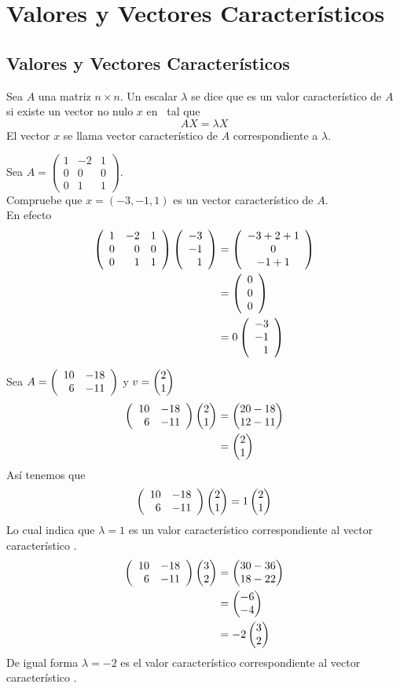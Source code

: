 \chapter{Valores y Vectores Característicos}
\section{Valores y Vectores Característicos}

\begin{dfn}
Sea $A$ una matriz $n\times n$. Un escalar $\lambda$ se dice que es un valor característico de $A$ si existe un vector no nulo $x$ en \rn \ tal que
$$A X = \lambda X$$
El vector $x$ se llama vector característico de $A$ correspondiente a $\lambda$.
\end{dfn}

\begin{ejemplo}
Sea $A = \left( \begin{array}{rrr}
1 & -2 & 1\\
0 & 0 & 0\\
0 & 1 & 1
\end{array} \right)$.\\
Compruebe que $x= (-3, -1, 1)$ es un vector característico de $A$.\\
\noindent En efecto 
\begin{align*}
\left( \begin{array}{rrr}
1 & -2 &1\\
0 & 0 & 0\\
0&1&1
\end{array} \right)
\left( \begin{array}{r} -3\\ -1\\ 1 \end{array} \right)  &=
\left( \begin{array}{c}
-3+2+1\\
0\\
-1+1
\end{array} \right)\\
&= \left( \begin{array}{r} 0\\ 0\\ 0 \end{array} \right) \\
&= 0 \left( \begin{array}{r} -3\\ -1\\ 1 \end{array} \right) 
\end{align*}
\end{ejemplo}


\begin{ejemplo}
Sea $A = \left( \begin{array}{rr} 10 & -18\\ 6 & -11 \end{array} \right) $ y $v= \begin{pmatrix} 2\\ 1\\ \end{pmatrix} $\\
\begin{align*}
 \left( \begin{array}{rr} 10 & -18\\ 6 & -11 \end{array} \right)  \begin{pmatrix} 2\\ 1\\ \end{pmatrix}  &= \begin{pmatrix} 20-18\\ 12-11\\ \end{pmatrix} \\
&= \begin{pmatrix} 2\\ 1\\ \end{pmatrix} 
\end{align*}
Así tenemos que 
$$ \left( \begin{array}{rr} 10 & -18\\ 6 & -11 \end{array} \right)  \begin{pmatrix} 2\\ 1\\ \end{pmatrix}  = 1 \begin{pmatrix} 2\\ 1\\ \end{pmatrix} $$
Lo cual indica que $\lambda = 1$ es un valor característico correspondiente al vector característico .
\begin{align*}
 \left( \begin{array}{rr} 10 & -18\\ 6 & -11 \end{array} \right)  \begin{pmatrix} 3\\ 2\\ \end{pmatrix}  &= \begin{pmatrix} 30-36\\ 18-22\\ \end{pmatrix} \\
&= \begin{pmatrix} -6\\ -4\\ \end{pmatrix} \\
&= -2 \begin{pmatrix} 3\\ 2\\ \end{pmatrix} 
\end{align*}
De igual forma $\lambda = -2$ es el valor característico correspondiente al vector característico .
\end{ejemplo}


